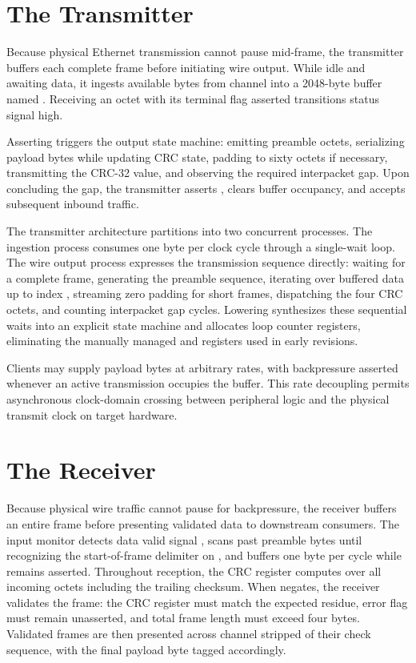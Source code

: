 \documentclass[journal,9pt]{IEEEtran}
\newcommand{\ethpart}[3]{%
}
\begin{document}
\section{The Transmitter}
\label{sec:e-tx}

Because physical Ethernet transmission cannot pause mid-frame, the
transmitter buffers each complete frame before initiating wire output.
While idle and awaiting data, it ingests available bytes from channel
 into a 2048-byte buffer named . Receiving an octet
with its terminal flag asserted transitions status signal 
high.

Asserting  triggers the output state machine: emitting
preamble octets, serializing payload bytes while updating CRC state,
padding to sixty octets if necessary, transmitting the CRC-32 value, and
observing the required interpacket gap. Upon concluding the gap, the
transmitter asserts , clears buffer occupancy, and accepts
subsequent inbound traffic.

The transmitter architecture partitions into two concurrent processes.
The ingestion process consumes one byte per clock cycle through a
single-wait loop. The wire output process expresses the transmission
sequence directly: waiting for a complete frame, generating the preamble
sequence, iterating over buffered data up to index , streaming
zero padding for short frames, dispatching the four CRC octets, and
counting interpacket gap cycles. Lowering synthesizes these sequential
waits into an explicit state machine and allocates loop counter registers,
eliminating the manually managed  and  registers
used in early revisions.

Clients may supply payload bytes at arbitrary rates, with backpressure
asserted whenever an active transmission occupies the buffer. This rate
decoupling permits asynchronous clock-domain crossing between peripheral
logic and the physical transmit clock on target hardware.

\ethpart{txstate}{The transmitter's state.}{lst:e-txstate}

\ethpart{tx}{The transmitter's step.}{lst:e-tx}

\section{The Receiver}
\label{sec:e-rx}

Because physical wire traffic cannot pause for backpressure, the receiver
buffers an entire frame before presenting validated data to downstream
consumers. The input monitor detects data valid signal ,
scans past preamble bytes until recognizing the start-of-frame delimiter on
, and buffers one byte per cycle while  remains
asserted. Throughout reception, the CRC register computes over all
incoming octets including the trailing checksum. When 
negates, the receiver validates the frame: the CRC register must match the
expected residue, error flag  must remain unasserted, and
total frame length must exceed four bytes. Validated frames are then
presented across channel  stripped of their check sequence, with
the final payload byte tagged accordingly.
\end{document}
